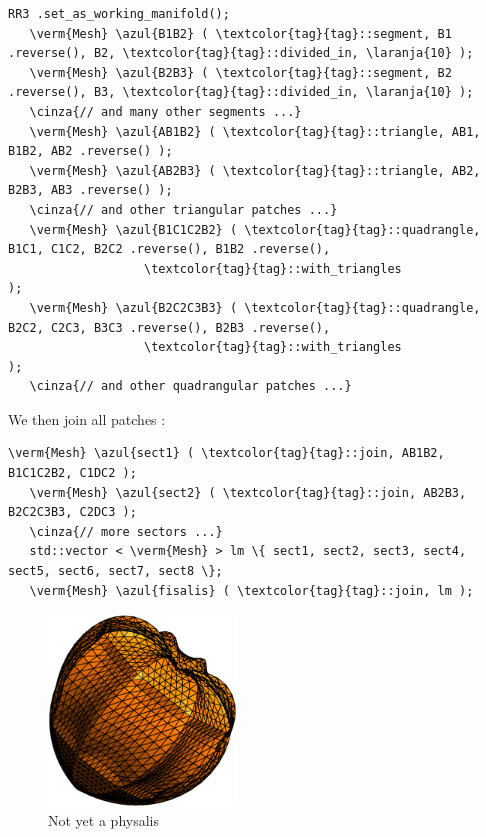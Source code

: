 \begin{Verbatim}[commandchars=\\\{\},formatcom=\small\tt,frame=single,
   label=parag-\ref{\numb section 2.\numb parag 13}.cpp,rulecolor=\color{coment},
   baselinestretch=0.94,framesep=2mm]
   RR3 .set_as_working_manifold();
   \verm{Mesh} \azul{B1B2} ( \textcolor{tag}{tag}::segment, B1 .reverse(), B2, \textcolor{tag}{tag}::divided_in, \laranja{10} );
   \verm{Mesh} \azul{B2B3} ( \textcolor{tag}{tag}::segment, B2 .reverse(), B3, \textcolor{tag}{tag}::divided_in, \laranja{10} );
   \cinza{// and many other segments ...}
   \verm{Mesh} \azul{AB1B2} ( \textcolor{tag}{tag}::triangle, AB1, B1B2, AB2 .reverse() );
   \verm{Mesh} \azul{AB2B3} ( \textcolor{tag}{tag}::triangle, AB2, B2B3, AB3 .reverse() );
   \cinza{// and other triangular patches ...}
   \verm{Mesh} \azul{B1C1C2B2} ( \textcolor{tag}{tag}::quadrangle, B1C1, C1C2, B2C2 .reverse(), B1B2 .reverse(),
                   \textcolor{tag}{tag}::with_triangles                                           );
   \verm{Mesh} \azul{B2C2C3B3} ( \textcolor{tag}{tag}::quadrangle, B2C2, C2C3, B3C3 .reverse(), B2B3 .reverse(),
                   \textcolor{tag}{tag}::with_triangles                                           );
   \cinza{// and other quadrangular patches ...}   
\end{Verbatim}

We then join all patches :
\begin{Verbatim}[commandchars=\\\{\},formatcom=\small\tt,frame=single,
   label=parag-\ref{\numb section 2.\numb parag 13}.cpp,rulecolor=\color{coment},
   baselinestretch=0.94,framesep=2mm]
   \verm{Mesh} \azul{sect1} ( \textcolor{tag}{tag}::join, AB1B2, B1C1C2B2, C1DC2 );
   \verm{Mesh} \azul{sect2} ( \textcolor{tag}{tag}::join, AB2B3, B2C2C3B3, C2DC3 );
   \cinza{// more sectors ...}
   std::vector < \verm{Mesh} > lm \{ sect1, sect2, sect3, sect4, sect5, sect6, sect7, sect8 \};
   \verm{Mesh} \azul{fisalis} ( \textcolor{tag}{tag}::join, lm ); 
\end{Verbatim}

\begin{figure}[ht] \centering
  \includegraphics[width=50mm]{fisalis-round}
  \caption{Not yet a physalis}
  \label{\numb section 2.\numb fig 15}
\end{figure}


